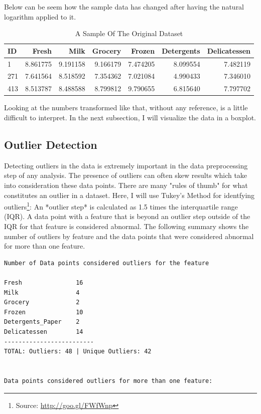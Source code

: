 \documentclass[a4paper]{article}
\begin{document}
Below can be seem how the sample data has changed after having the natural logarithm applied to it.

\begin{table}[ht!]
\centering
\begin{tabular}{l|rrrrrr}
{ID} &    Fresh &     Milk &  Grocery &    Frozen & Detergents & Delicatessen \\\hline
1   &  8.861775 &  9.191158 &  9.166179 &  7.474205 &          8.099554 &      7.482119 \\
271 &  7.641564 &  8.518592 &  7.354362 &  7.021084 &          4.990433 &      7.346010 \\
413 &  8.513787 &  8.488588 &  8.799812 &  9.790655 &          6.815640 &      7.797702 \\

\end{tabular}
\caption{\label{tab:log_sample}A Sample Of The Original Dataset}
\end{table}

Looking at the numbers transformed like that, without any reference, is a little difficult to interpret. In the next subsection, I will visualize the data in a boxplot.


\subsection{Outlier Detection}

Detecting outliers in the data is extremely important in the data preprocessing step of any analysis. The presence of outliers can often skew results which take into consideration these data points. There are many "rules of thumb" for what constitutes an outlier in a dataset. Here, I will use Tukey's Method for identfying outliers\footnote{Source: \url{http://goo.gl/FWfWnp}}: An *outlier step* is calculated as 1.5 times the interquartile range (IQR). A data point with a feature that is beyond an outlier step outside of the IQR for that feature is considered abnormal. The following summary shows the number of outliers by feature and the data points that were considered abnormal for more than one feature.

\begin{lstlisting}
Number of Data points considered outliers for the feature

Fresh             	16                
Milk              	4                 
Grocery           	2                 
Frozen            	10                
Detergents_Paper  	2                 
Delicatessen      	14                
-------------------------
TOTAL: Outliers: 48 | Unique Outliers: 42


Data points considered outliers for more than one feature:
\end{lstlisting}
\end{document}
